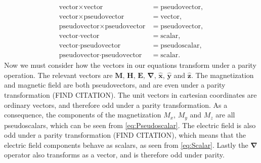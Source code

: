 \begin{subequations}
\begin{align}
    \label{eq:Pseudovector}
    \textrm{vector}\times\textrm{vector} &= \textrm{pseudovector}, \\
    \label{eq:Vector}
    \textrm{vector}\times\textrm{pseudovector} &= \textrm{vector}, \\
    \label{eq:PseudovectorPseudo}
    \textrm{pseudovector}\times\textrm{pseudovector} &= \textrm{pseudovector}, \\
    \label{eq:Scalar}
    \textrm{vector}\cdot\textrm{vector} &= \textrm{scalar}, \\
    \label{eq:Pseudoscalar}
    \textrm{vector}\cdot\textrm{pseudovector} &= \textrm{pseudoscalar}, \\
    \label{eq:ScalarPseudo}
    \textrm{pseudovector}\cdot\textrm{pseudovector} &= \textrm{scalar}.
\end{align}
\end{subequations}
Now we must consider how the vectors in our equations transform under a parity operation. The relevant vectors are $\mathbold{M}$, $\mathbold{H}$, $\mathbold{E}$, $\mathbold{\nabla}$, $\mathbold{\hat{x}}$, $\mathbold{\hat{y}}$ and $\mathbold{\hat{z}}$. The magnetization and magnetic field are both pseudovectors, and are even under a parity transformation (FIND CITATION). The unit vectors in cartesian coordinates are ordinary vectors, and therefore odd under a parity transformation. As a consequence, the components of the magnetization $M_x$, $M_y$ and $M_z$ are all pseudoscalars, which can be seen from \eqref{eq:Pseudoscalar}. The electric field is also odd under a parity transformation (FIND CITATION), which means that the electric field components behave as scalars, as seen from \eqref{eq:Scalar}. Lastly the $\mathbold{\nabla}$ operator also transforms as a vector, and is therefore odd under parity.


